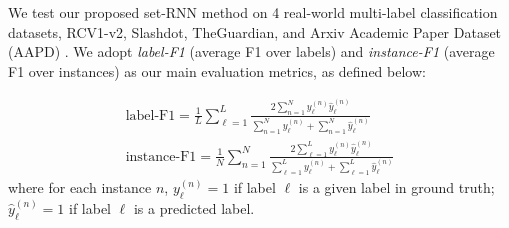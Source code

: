 We test our proposed set-RNN method on 4 real-world multi-label classification datasets, RCV1-v2, Slashdot, TheGuardian, and Arxiv Academic Paper Dataset (AAPD) \cite{DBLP:journals/corr/abs-1806-04822}. We adopt \emph{label-F1} (average F1 over labels) and \emph{instance-F1} (average F1 over instances) as our main evaluation metrics, as defined below:
 
\begin{align*} \text{label-F1} = \frac{1}{L}\sum_{\ell=1}^L\frac{2\sum_{n=1}^N y^{(n)}_\ell \hat{y}^{(n)}_\ell}{\sum_{n=1}^N y^{(n)}_\ell+\sum_{n=1}^N \hat{y}^{(n)}_\ell}\\
\text{instance-F1} = \frac{1}{N}\sum_{n=1}^N\frac{2\sum_{\ell=1}^L y^{(n)}_\ell \hat{y}^{(n)}_\ell}{\sum_{\ell=1}^L y^{(n)}_\ell+\sum_{\ell=1}^L \hat{y}^{(n)}_\ell}
\end{align*}
where for each instance $n$, $y_\ell^{(n)}=1$ if label $\ell$ is a given label in ground truth; $\hat{y}_\ell^{(n)}=1$ if label $\ell$ is a predicted label.



